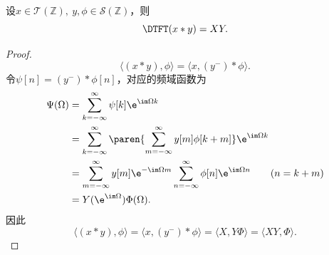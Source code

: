 \begin{theorem}[时域卷积定理]
    设$x\in\mathcal{T}(\mathbb{Z}),\ y,\phi\in\mathcal{S}(\mathbb{Z})$，则
    \begin{equation}
        \DTFT(x*y)=XY.
    \end{equation}
\end{theorem}
\begin{proof}
    \begin{equation}
        \langle(x*y),\phi\rangle=\langle x,(y^-)*\phi\rangle.
    \end{equation}
    令$\psi[n]=(y^-)*\phi[n]$，对应的频域函数为
    \begin{align}
        \Psi(\Omega)&=\sum_{k=-\infty}^{\infty}\psi[k]\e^{\im\Omega k} \nonumber \\
        &=\sum_{k=-\infty}^{\infty}\paren{\sum_{m=-\infty}^{\infty}y[m]\phi[k+m]}\e^{\im\Omega k} \nonumber \\
        &=\sum_{m=-\infty}^{\infty}y[m]\e^{-\im\Omega m}\sum_{n=-\infty}^{\infty}\phi[n]\e^{\im \Omega n} \qquad (n=k+m) \nonumber \\
        &=Y(\e^{\im\Omega})\Phi(\Omega).
    \end{align}
    因此
    \begin{equation}
        \langle(x*y),\phi\rangle=\langle x,(y^-)*\phi\rangle=\langle X,Y\Phi\rangle=\langle XY,\Phi\rangle.
    \end{equation}
\end{proof}


